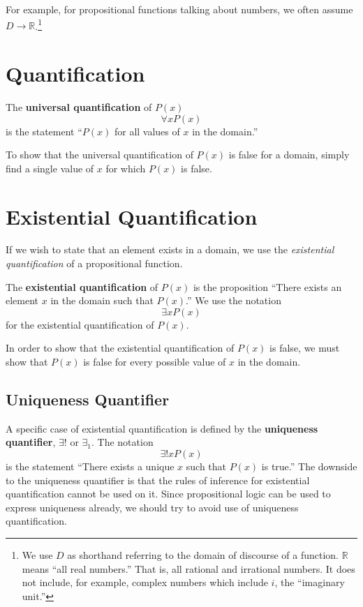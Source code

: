 For example, for propositional functions talking about numbers, we often assume $D \to\mathbb{R}$.\footnote{We use $D$ as shorthand referring to the domain of discourse of a function.
$\mathbb{R}$ means ``all real numbers.'' That is, all rational and irrational numbers. It does not include, for example, complex numbers which include $i$, the ``imaginary unit.''}


\section{Quantification}

The \textbf{universal quantification} of $P(x)$
\begin{equation}
  \forall x P(x)
\end{equation}
is the statement
``$P(x)$ for all values of $x$ in the domain.''

To show that the universal quantification of $P(x)$ is false for a domain, simply find a single value of $x$ for which $P(x)$ is false.

\section{Existential Quantification}

If we wish to state that an element exists in a domain, we use the \emph{existential quantification} of a propositional function.

The \textbf{existential quantification} of $P(x)$ is the proposition
  ``There exists an element $x$ in the domain such that $P(x)$.''
We use the notation \[\exists x P(x)\] for the existential quantification of $P(x)$.

\begin{note}
  In order to show that the existential quantification of $P(x)$ is false, we must
  show that $P(x)$ is false for every possible value of $x$ in the domain.
\end{note}


\subsection{Uniqueness Quantifier}
A specific case of existential quantification is defined by the
\textbf{uniqueness quantifier}, $\exists!$ or $\exists_1$. The notation
\[ \exists! x P(x) \]
is the statement ``There exists a unique $x$ such that $P(x)$ is true.'' The
downside to the uniqueness quantifier is that the rules of inference for
existential quantification cannot be used on it. Since propositional logic can
be used to express uniqueness already, we should try to avoid use of uniqueness
quantification.

